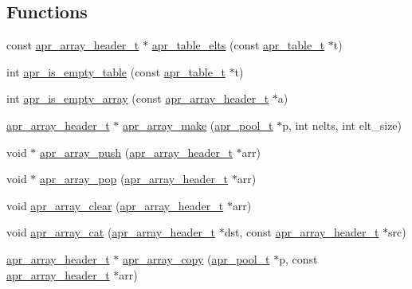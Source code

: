 \subsection*{Functions}
\begin{DoxyCompactItemize}
\item 
const \hyperlink{structapr__array__header__t}{apr\+\_\+array\+\_\+header\+\_\+t} $\ast$ \hyperlink{group__apr__tables_gaea3005541cce67481f48ab201b5c0cf3}{apr\+\_\+table\+\_\+elts} (const \hyperlink{group__apr__tables_gad7ea82d6608a4a633fc3775694ab71e4}{apr\+\_\+table\+\_\+t} $\ast$t)
\item 
int \hyperlink{group__apr__tables_ga198e52683a86ecf8df9642990c220ff7}{apr\+\_\+is\+\_\+empty\+\_\+table} (const \hyperlink{group__apr__tables_gad7ea82d6608a4a633fc3775694ab71e4}{apr\+\_\+table\+\_\+t} $\ast$t)
\item 
int \hyperlink{group__apr__tables_gacae19f5b2182d5813f4ef3050f82ff29}{apr\+\_\+is\+\_\+empty\+\_\+array} (const \hyperlink{structapr__array__header__t}{apr\+\_\+array\+\_\+header\+\_\+t} $\ast$a)
\item 
\hyperlink{structapr__array__header__t}{apr\+\_\+array\+\_\+header\+\_\+t} $\ast$ \hyperlink{group__apr__tables_ga8f4308b5a1636ec06544113a9c283304}{apr\+\_\+array\+\_\+make} (\hyperlink{group__apr__pools_gaf137f28edcf9a086cd6bc36c20d7cdfb}{apr\+\_\+pool\+\_\+t} $\ast$p, int nelts, int elt\+\_\+size)
\item 
void $\ast$ \hyperlink{group__apr__tables_gac08267b32905197dd02ffff3314d9603}{apr\+\_\+array\+\_\+push} (\hyperlink{structapr__array__header__t}{apr\+\_\+array\+\_\+header\+\_\+t} $\ast$arr)
\item 
void $\ast$ \hyperlink{group__apr__tables_gad1ab3e0ca2de25a7ff2fbed393380972}{apr\+\_\+array\+\_\+pop} (\hyperlink{structapr__array__header__t}{apr\+\_\+array\+\_\+header\+\_\+t} $\ast$arr)
\item 
void \hyperlink{group__apr__tables_ga6a6436840256ed8a47b5d6be4ea2ae03}{apr\+\_\+array\+\_\+clear} (\hyperlink{structapr__array__header__t}{apr\+\_\+array\+\_\+header\+\_\+t} $\ast$arr)
\item 
void \hyperlink{group__apr__tables_ga532e0f0e4d1e2b7243ebdb7eb1f783c7}{apr\+\_\+array\+\_\+cat} (\hyperlink{structapr__array__header__t}{apr\+\_\+array\+\_\+header\+\_\+t} $\ast$dst, const \hyperlink{structapr__array__header__t}{apr\+\_\+array\+\_\+header\+\_\+t} $\ast$src)
\item 
\hyperlink{structapr__array__header__t}{apr\+\_\+array\+\_\+header\+\_\+t} $\ast$ \hyperlink{group__apr__tables_ga327e2d5e29fa49d5a2a31295a6932950}{apr\+\_\+array\+\_\+copy} (\hyperlink{group__apr__pools_gaf137f28edcf9a086cd6bc36c20d7cdfb}{apr\+\_\+pool\+\_\+t} $\ast$p, const \hyperlink{structapr__array__header__t}{apr\+\_\+array\+\_\+header\+\_\+t} $\ast$arr)

\end{DoxyCompactItemize}
